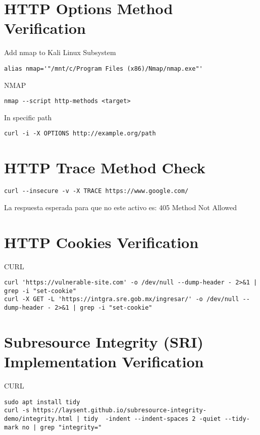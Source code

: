 \section{HTTP Options Method Verification}

Add nmap to Kali Linux Subsystem
\begin{lstlisting}[numbers=none]
alias nmap='"/mnt/c/Program Files (x86)/Nmap/nmap.exe"'
\end{lstlisting}

NMAP
\begin{lstlisting}[numbers=none]
nmap --script http-methods <target>
\end{lstlisting}

In specific path
\begin{lstlisting}[numbers=none]
curl -i -X OPTIONS http://example.org/path
\end{lstlisting}

\section{HTTP Trace Method Check}

\begin{lstlisting}[numbers=none]
curl --insecure -v -X TRACE https://www.google.com/
\end{lstlisting}

La respuesta esperada para que no este activo es: 405 Method Not Allowed

\section{HTTP Cookies Verification}

CURL
\begin{lstlisting}[numbers=none]
curl 'https://vulnerable-site.com' -o /dev/null --dump-header - 2>&1 | grep -i "set-cookie"
curl -X GET -L 'https://intgra.sre.gob.mx/ingresar/' -o /dev/null --dump-header - 2>&1 | grep -i "set-cookie"
\end{lstlisting}

\section{Subresource Integrity (SRI)  Implementation Verification}

CURL
\begin{lstlisting}[numbers=none]
sudo apt install tidy
curl -s https://laysent.github.io/subresource-integrity-demo/integrity.html | tidy  -indent --indent-spaces 2 -quiet --tidy-mark no | grep "integrity="
\end{lstlisting}


